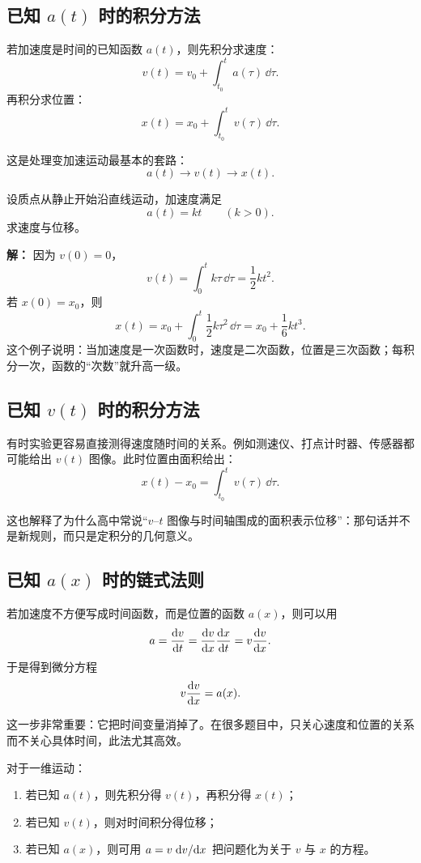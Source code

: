 \subsection{已知 $a(t)$ 时的积分方法}

若加速度是时间的已知函数 $a(t)$，则先积分求速度：
\[
 v(t)=v_0+\int_{t_0}^{t} a(\tau)\,\dd \tau.
\]
再积分求位置：
\[
 x(t)=x_0+\int_{t_0}^{t} v(\tau)\,\dd \tau.
\]

这是处理变加速运动最基本的套路：
\[
 a(t) \longrightarrow v(t) \longrightarrow x(t).
\]

\begin{example}[线性增大的加速度]
设质点从静止开始沿直线运动，加速度满足
\[
 a(t)=kt \qquad (k>0).
\]
求速度与位移。

\textbf{解：}
因为 $v(0)=0$，
\[
 v(t)=\int_0^t k\tau\,\dd \tau=\frac12 kt^2.
\]
若 $x(0)=x_0$，则
\[
 x(t)=x_0+\int_0^t \frac12 k\tau^2\,\dd \tau=x_0+\frac16 kt^3.
\]
这个例子说明：当加速度是一次函数时，速度是二次函数，位置是三次函数；每积分一次，函数的``次数''就升高一级。
\end{example}

\subsection{已知 $v(t)$ 时的积分方法}

有时实验更容易直接测得速度随时间的关系。例如测速仪、打点计时器、传感器都可能给出 $v(t)$ 图像。此时位置由面积给出：
\[
 x(t)-x_0=\int_{t_0}^{t} v(\tau)\,\dd \tau.
\]

这也解释了为什么高中常说``$v$--$t$ 图像与时间轴围成的面积表示位移''：那句话并不是新规则，而只是定积分的几何意义。

\subsection{已知 $a(x)$ 时的链式法则}

若加速度不方便写成时间函数，而是位置的函数 $a(x)$，则可以用
\[
 a=\dv{v}{t}=\dv{v}{x}\dv{x}{t}=v\dv{v}{x}.
\]
于是得到微分方程
\[
 v\dv{v}{x}=a(x).
\]

这一步非常重要：它把时间变量消掉了。在很多题目中，只关心速度和位置的关系而不关心具体时间，此法尤其高效。

\begin{theorem}[变加速运动的三种基本求解路径]
对于一维运动：
\begin{enumerate}
  \item 若已知 $a(t)$，则先积分得 $v(t)$，再积分得 $x(t)$；
  \item 若已知 $v(t)$，则对时间积分得位移；
  \item 若已知 $a(x)$，则可用 $a=v\dv*{v}{x}$ 把问题化为关于 $v$ 与 $x$ 的方程。
\end{enumerate}
\end{theorem}

